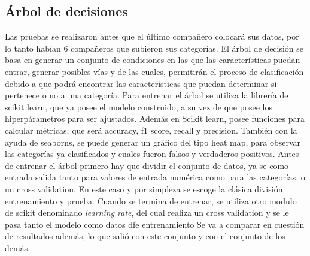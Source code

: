 \documentclass[conference]{IEEEtran}
\begin{document}
\subsection{Árbol de decisiones}
Las pruebas se realizaron antes que el último compañero colocará sus datos, por lo tanto habían 6 compañeros que subieron sus categorías.
El árbol de decisión se basa en generar un conjunto de condiciones en las que las características puedan entrar, generar posibles vías y de las cuales, permitirán el proceso de clasificación debido a que podrá encontrar las características que puedan determinar si pertenece o no a una categoría.
Para entrenar el árbol se utiliza la librería de scikit learn, que ya posee el modelo construido, a su vez de que posee los hiperpárametros para ser ajustados. Además en Scikit learn, posee funciones para calcular métricas, que será accuracy, f1 score, recall y precision. También con la ayuda de seaborns, se puede generar un gráfico del tipo heat map, para observar las categorías ya clasificados y cuales fueron falsos y verdaderos positivos. Antes de entrenar el árbol primero hay que dividir el conjunto de datos, ya se como entrada salida tanto para valores de entrada numérica como para las categorías, o un cross validation. En este caso y por simpleza se escoge la clásica división entrenamiento y prueba. 
Cuando se termina de entrenar, se utiliza  otro modulo de scikit denominado \textit{learning rate}, del cual realiza un cross validation y se le pasa tanto el modelo como datos dfe entrenamiento
Se va a comparar en cuestión de resultados además, lo que salió con este conjunto y con el conjunto de los demás.
\end{document}

